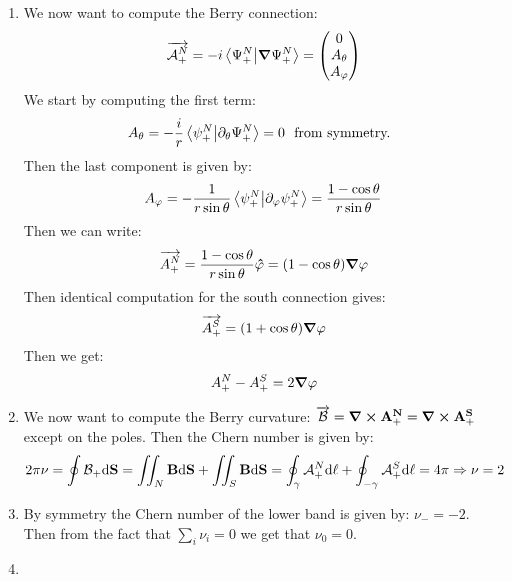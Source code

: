 \documentclass[10pt,a4paper]{book}
\begin{document}
\begin{enumerate}
\item We now want to compute the Berry connection:
\[
\overrightarrow{\mathcal{A}_+^N} = - i \braket{\Psi_+^N}{\grad \Psi_{+}^N} = \begin{pmatrix}
0 \\ A_\theta \\ A_\varphi
\end{pmatrix}
\] 
We start by computing the first term:
\[
A_\theta = - \frac{i}{r} \braket{\psi_+^N}{\partial_\theta \Psi_+^N} = 0 \mbox{~~from symmetry.~~}
\]
Then the last component is given by:
\[
A_\varphi = - \frac{1}{r \sin \theta} \braket{\psi_+^N}{\partial_\varphi \psi_+^N} = \frac{1 - \cos \theta}{r \sin \theta} 
\]
Then we can write:
\[
\overrightarrow{A_+^N} = \frac{1 - \cos \theta}{r \sin \theta} \vu{\varphi} = (1 - \cos\theta) \grad \varphi
\]
Then identical computation for the south connection gives:
\[
\overrightarrow{A_+^S} = (1 + \cos\theta) \grad \varphi
\]
Then we get:
\[
A_+^N - A_+^S = 2 \grad \varphi
\]

\item We now want to compute the Berry curvature: $\overrightarrow{\mathcal{B}} = \curl \vb{A_+^N} = \curl \vb{A_+^S}$ except on the poles. Then the Chern number is given by:
\[
2 \pi \nu = \oint \vb{\mathcal{B}_+} \dd \vb{S} = \iint_N \vb{B} \dd \vb{S}  + \iint_S \vb{B} \dd \vb{S} = \oint_\gamma \mathcal{A}_+^N \dd \ell + \oint_{-\gamma} \mathcal{A}_+^S \dd \ell = 4 \pi \Rightarrow \nu = 2
\]

\item By symmetry the Chern number of the lower band is given by: $\nu_- = -2$. Then from the fact that $\sum_i \nu_i = 0$ we get that $\nu_0 = 0$. 

\item 

\end{enumerate}
\end{document}
